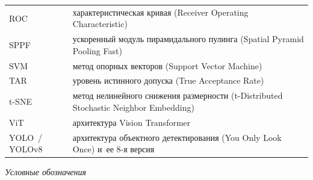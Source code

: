 \begin{longtable}{@{}p{}p{}@{}}
ROC     & характеристическая кривая (Receiver Operating Characteristic)\\
SPPF    & ускоренный модуль пирамидального пулинга (Spatial Pyramid Pooling Fast)\\
SVM     & метод опорных векторов (Support Vector Machine)\\
TAR     & уровень истинного допуска (True Acceptance Rate)\\
t-SNE   & метод нелинейного снижения размерности (t-Distributed Stochastic Neighbor Embedding)\\
ViT     & архитектура Vision Transformer\\
YOLO~/ YOLOv8 & архитектура объектного детектирования (You Only Look Once) и~ее 8-я версия\\
\end{longtable}

\vspace{1em}

\noindent\textit{Условные обозначения}

